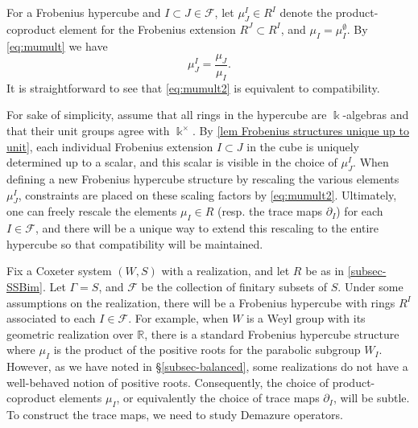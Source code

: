 For a Frobenius hypercube and $I \subset J \in \mathcal{F}$, let $\mu^I_J \in R^I$ denote the product-coproduct element for the Frobenius extension $R^J \subset R^I$, and $\mu_I = \mu^{\emptyset}_I$. By \eqref{eq:mumult} we have
\begin{equation} \label{eq:mumult2} \mu^I_J = \frac{\mu_J}{\mu_I}.\end{equation}
It is straightforward to see that \eqref{eq:mumult2} is equivalent to compatibility.

For sake of simplicity, assume that all rings in the hypercube are $\Bbbk$-algebras and that their unit groups agree with $\Bbbk^\times$.  By \cref{lem Frobenius structures unique up to unit}, each individual Frobenius extension $I \subset J$ in the cube is uniquely determined up to a scalar, and this scalar is visible in the choice of $\mu^I_J$. When defining a new Frobenius hypercube structure by rescaling the various elements $\mu^I_J$, constraints are placed on these scaling factors by \eqref{eq:mumult2}. Ultimately, one can freely rescale the elements $\mu_I \in R$ (resp. the trace maps $\partial_I$) for each $I \in \mathcal{F}$, and there will be a unique way to extend this rescaling to the entire hypercube so that compatibility will be maintained.

Fix a Coxeter system $(W,S)$ with a realization, and let $R$ be as in \cref{subsec- SSBim}. 
Let $\Gamma = S$, and $\mathcal{F}$ be the collection of finitary subsets of $S$. Under some assumptions on the realization, there will be a Frobenius hypercube with rings $R^I$ associated to each $I \in \mathcal{F}$. For example, when $W$ is a Weyl group with its geometric realization over $\mathbb{R}$, there is a standard Frobenius hypercube structure where $\mu_I$ is the product of the positive roots for the parabolic subgroup $W_I$. However, as we have noted in \S\ref{subsec-balanced}, some realizations do not have a well-behaved notion of positive roots. Consequently, the choice of product-coproduct elements $\mu_I$, or equivalently the choice of trace maps $\partial_I$, will be subtle. To construct the trace maps, we need to study Demazure operators.
 



